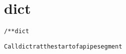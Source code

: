 \section{dict}
\begin{shaded}
\begin{alltt}
/** dict

  Call dictr at the start of a pipe segment

\end{alltt}
\end{shaded}
